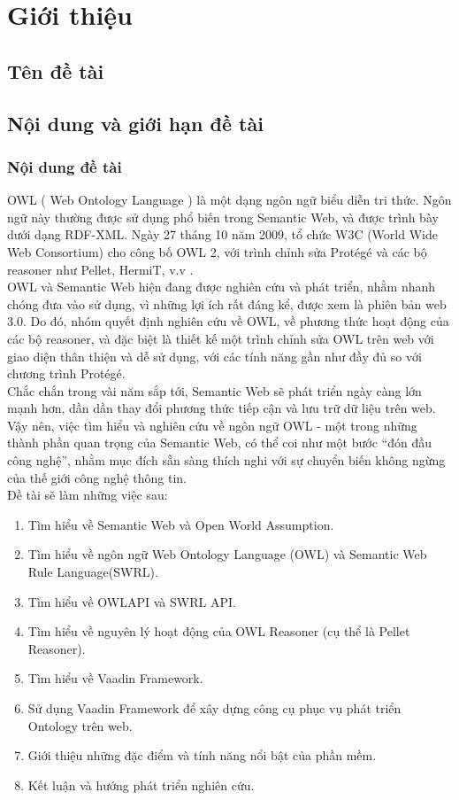 \chapter {Giới thiệu}
\section{Tên đề tài}

\section{Nội dung và giới hạn đề tài}
\subsection{Nội dung đề tài}
OWL ( Web Ontology Language ) là một dạng ngôn ngữ biểu diễn tri thức. Ngôn ngữ này thường được sử dụng phổ biến trong Semantic Web, và được trình bày dưới dạng RDF-XML. Ngày 27 tháng 10 năm 2009, tổ chức W3C (World Wide Web Consortium) cho công bố OWL 2, với trình chỉnh sửa Protégé và các bộ reasoner như Pellet, HermiT, v.v .
\\
OWL và Semantic Web hiện đang được nghiên cứu và phát triển, nhằm nhanh chóng đưa vào sử dụng, vì những lợi ích rất đáng kể, được xem là phiên bản web 3.0. Do đó, nhóm quyết định nghiên cứu về OWL, về phương thức hoạt động của các bộ reasoner, và đặc biệt là thiết kế một trình chỉnh sửa OWL trên web với giao diện thân thiện và dễ sử dụng, với các tính năng gần như đầy đủ so với chương trình Protégé. 
\\
Chắc chắn trong vài năm sắp tới, Semantic Web sẽ phát triển ngày càng lớn mạnh hơn, dần dần thay đổi phương thức tiếp cận và lưu trữ dữ liệu trên web. Vậy nên, việc tìm hiểu và nghiên cứu về ngôn ngữ OWL - một trong những thành phần quan trọng của Semantic Web, có thể coi như một bước “đón đầu công nghệ”, nhằm mục đích sẵn sàng thích nghi với sự chuyển biến không ngừng của thế giới công nghệ thông tin.
\\
Đề tài sẽ làm những việc sau:
\begin{enumerate}
\item Tìm hiểu về Semantic Web và Open World Assumption.
\item Tìm hiểu về ngôn ngữ Web Ontology Language (OWL) và Semantic Web Rule Language(SWRL).
\item Tìm hiểu về OWLAPI và SWRL API.
\item Tìm hiểu về nguyên lý hoạt động của OWL Reasoner (cụ thể là Pellet Reasoner).
\item Tìm hiểu về Vaadin Framework.
\item Sử dụng Vaadin Framework để xây dựng công cụ phục vụ phát triển Ontology trên web.
\item Giới thiệu những đặc điểm và tính năng nổi bật của phần mềm.
\item Kết luận và hướng phát triển nghiên cứu.
\end{enumerate}
